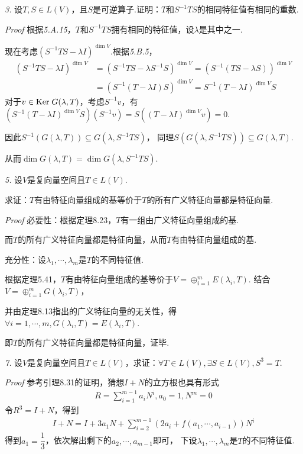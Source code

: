 \newpage

\textit{3.}
设\(T,S \in L(V)\)，且\(S\)是可逆算子.证明：\(T\)和\(S^{-1}TS\)的相同特征值有相同的重数.

\textit{Proof}
根据\textit{5.A.15}，\(T\)和\(S^{-1}TS\)拥有相同的特征值，设\(\lambda\)是其中之一.

现在考虑\((S^{-1}TS-\lambda I)^{\dim V}\).根据\textit{5.B.5}，
    \begin{align*}
        (S^{-1}TS-\lambda I)^{\dim V}&=(S^{-1}TS-\lambda S^{-1}S)^{\dim V}=(S^{-1}(TS-\lambda S))^{\dim V} \\
        &=(S^{-1}(T-\lambda I)S)^{\dim V}=S^{-1}(T-\lambda I)^{\dim V}S
    \end{align*}
对于\(v \in \mathrm{Ker \;} G(\lambda,T)\)，考虑\(S^{-1}v\)，有
\((S^{-1}(T-\lambda I)^{\dim V}S)(S^{-1}v)=S((T-\lambda I)^{\dim V}v)=0\).

因此\(S^{-1}(G(\lambda,T)) \subseteq G(\lambda,S^{-1}TS)\)，
同理\(S(G(\lambda,S^{-1}TS)) \subseteq G(\lambda,T)\).

从而\(\dim G(\lambda,T)=\dim G(\lambda,S^{-1}TS)\).

\hspace*{\fill}

\textit{5.}
设\(V\)是复向量空间且\(T \in L(V)\).

求证：\(T\)有由特征向量组成的基等价于\(T\)的所有广义特征向量都是特征向量.

\textit{Proof}
必要性：根据定理8.23，\(T\)有一组由广义特征向量组成的基.

而\(T\)的所有广义特征向量都是特征向量，从而\(T\)有由特征向量组成的基.

充分性：设\(\lambda_1,\cdots,\lambda_m\)是\(T\)的不同特征值.

根据定理5.41，\(T\)有由特征向量组成的基等价于\(V=\oplus_{i=1}^m E(\lambda_i,T)\).
结合\(V=\oplus_{i=1}^m G(\lambda_i,T)\)，

并由定理8.13指出的广义特征向量的无关性，得\(\forall i=1,\cdots,m,G(\lambda_i,T)=E(\lambda_i,T)\).

即\(T\)的所有广义特征向量都是特征向量，证毕.

\hspace*{\fill}

\textit{7.}
设\(V\)是复向量空间且\(T \in L(V)\)，求证：\(\forall T \in L(V),\exists S \in L(V),S^3=T\).

\textit{Proof}
参考引理8.31的证明，猜想\(I+N\)的立方根也具有形式
    \begin{align*}
        R=\sum_{i=1}^{m-1} a_iN^i,a_0=1,N^m=0
    \end{align*}
令\(R^3=I+N\)，得到
    \begin{align*}
        I+N=I+3a_1N+\sum_{i=2}^{m-1} (2a_i+f(a_1,\cdots,a_{i-1}))N^i
    \end{align*}
得到\(a_1=\dfrac{1}{3}\)，依次解出剩下的\(a_2,\cdots,a_{m-1}\)即可，
下设\(\lambda_1,\cdots,\lambda_m\)是\(T\)的不同特征值.

